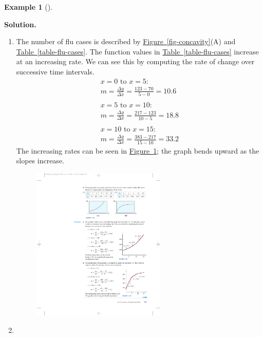 \documentclass[10pt,]{book}
\theoremstyle{plain}
\theoremstyle{definition}
\theoremstyle{definition}
\newtheorem{example}[theorem]{Example}
\numberwithin{equation}{section}
\begin{document}
\begin{example}[]
\begin{figure}
\end{figure}
\par\medskip\noindent%
\textbf{Solution.}\quad \leavevmode%
\begin{enumerate}[label=*\alph**]
\item\hypertarget{li-325}{}The number of flu cases is described by \hyperref[fig-concavity]{Figure~\ref{fig-concavity}}(A) and \hyperref[table-flu-cases]{Table~\ref{table-flu-cases}}. The function values in \hyperref[table-flu-cases]{Table~\ref{table-flu-cases}} increase at an increasing rate. We can see this by computing the rate of change over successive time intervals. 
        \begin{gather*}
x = 0 \text{ to } x = 5: \\
m = \frac{\Delta y}{\Delta x}=\frac{123−70}{5−0} = 10.6\\
\\
 x = 5\text{ to }  x = 10:\\
 m = \frac{\Delta y}{\Delta x}=\frac{217−123}{10−5} = 18.8\\
\\
x = 10 \text{ to } x = 15:\\
m = \frac{\Delta y}{\Delta x} 
            =\frac{383 − 217}{15 − 10} = 33.2
\end{gather*}
        The increasing rates can be seen in \hyperref[fig-concave-up]{Figure~\ref{fig-concave-up}}; the graph bends upward as the slopes increase.
\leavevmode%
\begin{figure}
\centering
\includegraphics[width=0.60\textwidth,]{images/fig-concave-up.pdf}\caption{\label{fig-concave-up}}
\end{figure}
\item\hypertarget{li-326}{}

\end{enumerate}
\end{example}
\end{document}
